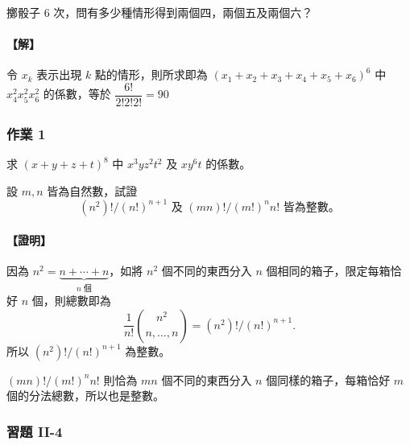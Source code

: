 \medskip
\begin{example}\label{ex:b5s-2-23}
擲骰子 6 次，問有多少種情形得到兩個四，兩個五及兩個六？
\end{example}
\paragraph{【解】}
令 $x_k$ 表示出現 $k$ 點的情形，則所求即為 $(x_1 + x_2 + x_3 + x_4 + x_5 + x_6)^6$ 中 $x_4^2 x_5^2 x_6^2$ 的係數，等於 $\dfrac{6!}{2! 2! 2!} = 90$

\medskip
\subsubsection*{作業 1}
\label{hw:b5s-2-1}求 $(x + y + z + t)^8$ 中 $x^3 y z^2 t^2$ 及 $x y^6 t$ 的係數。

\medskip
\begin{example}\label{ex:b5s-2-24}
設 $m, n$ 皆為自然數，試證
\[ (n^2)! / (n!)^{n+1} \text{ 及 } (mn)! / (m!)^n n! \text{ 皆為整數。} \]
\end{example}
\paragraph{【證明】}
因為 $n^2 = \underbrace{n + \dotsb + n}_{n\text{ 個}}$，如將 $n^2$ 個不同的東西分入 $n$ 個相同的箱子，限定每箱恰好 $n$ 個，則總數即為
\[ \frac{1}{n!} \binom{n^2}{n, \dots, n} = (n^2)! / (n!)^{n+1}. \]
所以 $(n^2)! / (n!)^{n+1}$ 為整數。

$(mn)! / (m!)^n n!$ 則恰為 $mn$ 個不同的東西分入 $n$ 個同樣的箱子，每箱恰好 $m$ 個的分法總數，所以也是整數。

\subsubsection*{習題 II-4}\label{sec:b5s-ex2-4}

